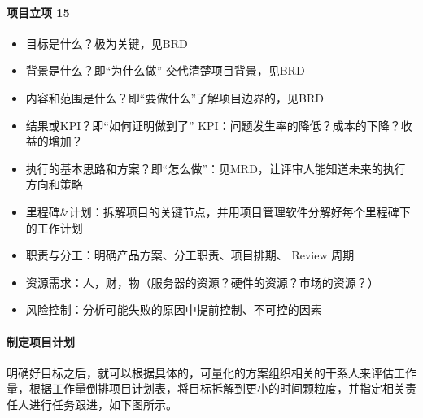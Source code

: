 \documentclass[letterpaper,10pt,english]{sphinxmanual}
\begin{document}
\paragraph{项目立项 15\sphinxfootnotemark[649]}
\label{\detokenize{chapter_knowledge/project_manage:id7}}%
\begin{footnotetext}[649]\sphinxAtStartFootnote
{}
%
\end{footnotetext}\ignorespaces \begin{itemize}
\item {} 
目标是什么？极为关键，见BRD

\item {} 
背景是什么？即“为什么做” 交代清楚项目背景，见BRD

\item {} 
内容和范围是什么？即“要做什么”了解项目边界的，见BRD

\item {} 
结果或KPI？即“如何证明做到了”
KPI：问题发生率的降低？成本的下降？收益的增加？

\item {} 
执行的基本思路和方案？即“怎么做”：见MRD，让评审人能知道未来的执行方向和策略

\item {} 
里程碑\&计划：拆解项目的关键节点，并用项目管理软件分解好每个里程碑下的工作计划

\item {} 
职责与分工：明确产品方案、分工职责、项目排期、 Review 周期
%
\begin{footnote}[650]\sphinxAtStartFootnote
{}
%
\end{footnote}

\item {} 
资源需求：人，财，物（服务器的资源？硬件的资源？市场的资源？）

\item {} 
风险控制：分析可能失败的原因中提前控制、不可控的因素

\end{itemize}


\paragraph{制定项目计划}
\label{\detokenize{chapter_knowledge/project_manage:id8}}
明确好目标之后，就可以根据具体的，可量化的方案组织相关的干系人来评估工作量，根据工作量倒排项目计划表，将目标拆解到更小的时间颗粒度，并指定相关责任人进行任务跟进，如下图所示。
\end{document}
